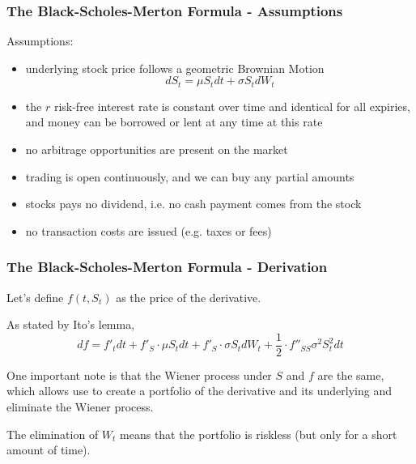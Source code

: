 \documentclass[ignorenonframetext, 9pt]{beamer}
\begin{document}
\begin{frame}
\frametitle{The Black-Scholes-Merton Formula - Assumptions}

Assumptions:

\pause

\begin{itemize}[<+->]
\item underlying stock price follows a geometric Brownian Motion
  \begin{equation}
    dS_t = \mu S_t dt + \sigma S_t dW_t
  \end{equation}
\item the $r$ risk-free interest rate is constant over time and identical for all expiries, and money can be borrowed or lent at any time at this rate
\item no arbitrage opportunities are present on the market
\item trading is open continuously, and we can buy any partial amounts
\item stocks pays no dividend, i.e. no cash payment comes from the stock
\item no transaction costs are issued (e.g. taxes or fees)
\end{itemize}

\end{frame}

\begin{frame}
\frametitle{The Black-Scholes-Merton Formula - Derivation}

Let's define $f(t, S_t)$ as the price of the derivative. \newline

\pause

As stated by Ito's lemma,
\begin{equation}
df = f'_t dt + f'_S \cdot \mu S_t dt + f'_S \cdot \sigma S_t dW_t + \frac{1}{2}\cdot f''_{SS} \sigma^2 S_t^2 dt
\end{equation} \newline

\pause

One important note is that the Wiener process under $S$ and $f$ are the same, which allows use to create a portfolio of the derivative and its underlying and eliminate the Wiener process. \newline

The elimination of $W_t$ means that the portfolio is riskless (but only for a short amount of time).

\end{frame}
\end{document}
